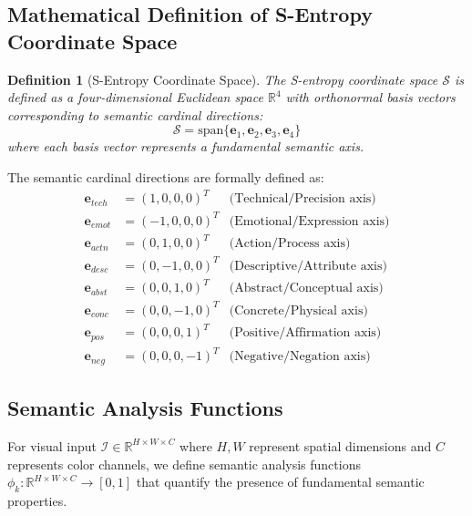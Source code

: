 \documentclass[11pt,a4paper]{article}
\newtheorem{definition}[theorem]{Definition}
\begin{document}
\subsection{Mathematical Definition of S-Entropy Coordinate Space}

\begin{definition}[S-Entropy Coordinate Space]
The S-entropy coordinate space $\mathcal{S}$ is defined as a four-dimensional Euclidean space $\mathbb{R}^4$ with orthonormal basis vectors corresponding to semantic cardinal directions:
\begin{equation}
\mathcal{S} = \text{span}\{\mathbf{e}_1, \mathbf{e}_2, \mathbf{e}_3, \mathbf{e}_4\}
\label{eq:s-entropy-space}
\end{equation}
where each basis vector represents a fundamental semantic axis.
\end{definition}

The semantic cardinal directions are formally defined as:
\begin{align}
\mathbf{e}_{tech} &= (1, 0, 0, 0)^T & \text{(Technical/Precision axis)} \label{eq:tech-axis} \\
\mathbf{e}_{emot} &= (-1, 0, 0, 0)^T & \text{(Emotional/Expression axis)} \label{eq:emot-axis} \\
\mathbf{e}_{actn} &= (0, 1, 0, 0)^T & \text{(Action/Process axis)} \label{eq:actn-axis} \\
\mathbf{e}_{desc} &= (0, -1, 0, 0)^T & \text{(Descriptive/Attribute axis)} \label{eq:desc-axis} \\
\mathbf{e}_{abst} &= (0, 0, 1, 0)^T & \text{(Abstract/Conceptual axis)} \label{eq:abst-axis} \\
\mathbf{e}_{conc} &= (0, 0, -1, 0)^T & \text{(Concrete/Physical axis)} \label{eq:conc-axis} \\
\mathbf{e}_{pos} &= (0, 0, 0, 1)^T & \text{(Positive/Affirmation axis)} \label{eq:pos-axis} \\
\mathbf{e}_{neg} &= (0, 0, 0, -1)^T & \text{(Negative/Negation axis)} \label{eq:neg-axis}
\end{align}

\subsection{Semantic Analysis Functions}

For visual input $\mathcal{I} \in \mathbb{R}^{H \times W \times C}$ where $H, W$ represent spatial dimensions and $C$ represents color channels, we define semantic analysis functions $\phi_k: \mathbb{R}^{H \times W \times C} \to [0,1]$ that quantify the presence of fundamental semantic properties.
\end{document}
